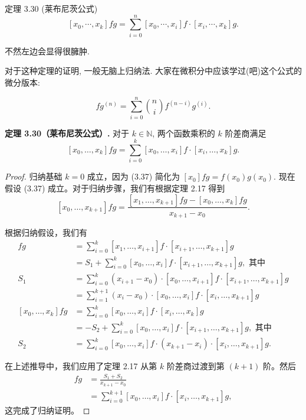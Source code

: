\documentclass[a4paper]{ctexart}
\begin{document}
{定理 3.30 (莱布尼茨公式)
$$
[x_0, \cdots, x_k] fg = \sum_{i = 0}^n [x_0, \cdots, x_i] f \cdot
[x_i, \cdots, x_k] g.
$$

不然左边会显得很臃肿.

对于这种定理的证明, 一般无脑上归纳法. 大家在微积分中应该学过(吧)这个公式的微分版本:

$$
fg^{(n)} = \sum_{i = 0}^n {n \choose i} f^{(n - i)}g^{(i)}.
$$


\noindent \textbf{定理 3.30（莱布尼茨公式）.} 对于 $k \in \mathbb{N}$, 两个函数乘积的 $k$ 阶差商满足
\[
[x_0, \ldots, x_k] f g = \sum_{i=0}^k [x_0, \ldots, x_i] f \cdot [x_i, \ldots, x_k] g.
\tag{3.37}
\]

\begin{proof}
归纳基础 $k = 0$ 成立，因为 (3.37) 简化为 $[x_0] f g = f(x_0) g(x_0)$. 现在假设 (3.37) 成立。对于归纳步骤，我们有根据定理 2.17 得到
\[
  [x_0, \ldots, x_{k+1}] f g = \frac{[x_1, \ldots, x_{k+1}] f g - [x_0, \ldots, x_k] f g}{x_{k+1} - x_0}.
\]
  
根据归纳假设，我们有
\begin{align*}
  [x_1, \ldots, x_{k+1}] f g &= \sum_{i=0}^k [x_1, \ldots, x_{i+1}] f \cdot [x_{i+1}, \ldots, x_{k+1}] g \\
  &= S_1 + \sum_{i=0}^k [x_0, \ldots, x_i] f \cdot [x_{i+1}, \ldots, x_{k+1}] g, \text{ 其中} \\
  S_1 &= \sum_{i=0}^k (x_{i+1} - x_0) \cdot [x_0, \ldots, x_{i+1}] f \cdot [x_{i+1}, \ldots, x_{k+1}] g \\
  &= \sum_{i=1}^{k+1} (x_i - x_0) \cdot [x_0, \ldots, x_i] f \cdot [x_i, \ldots, x_{k+1}] g \\
  [x_0, \ldots, x_k] f g &= \sum_{i=0}^k [x_0, \ldots, x_i] f \cdot [x_i, \ldots, x_k] g \\
  &= -S_2 + \sum_{i=0}^k [x_0, \ldots, x_i] f \cdot [x_{i+1}, \ldots, x_{k+1}] g, \text{ 其中} \\
  S_2 &= \sum_{i=0}^k [x_0, \ldots, x_i] f \cdot (x_{k+1} - x_i) \cdot [x_i, \ldots, x_{k+1}] g.
\end{align*}
  
在上述推导中，我们应用了定理 2.17 从第 $k$ 阶差商过渡到第 $(k+1)$ 阶。然后
  \begin{align*}
  [x_0, \ldots, x_{k+1}] f g &= \frac{S_1 + S_2}{x_{k+1} - x_0} \\
  &= \sum_{i=0}^{k+1} [x_0, \ldots, x_i] f \cdot [x_i, \ldots, x_{k+1}] g,
  \end{align*}
这完成了归纳证明。
\end{proof}

}
\end{document}
